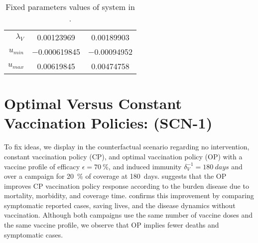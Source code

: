 \begin{table*}[tbh]
\begin{center}
\begin{tabular}{rc@{}c}
            $\lambda_{V}$
            & \num{0.00123969}
            & \num{0.00189903}
            \\
            $u_{min}$
            & \num{-0.000619845}
            & \num{-0.00094952}
            \\
            $u_{max}$
            & \num{0.00619845}
            & \num{0.00474758}
            \\
            \bottomrule
        \end{tabular}
        \caption{%
            Fixed parameters values of system in
            .}
        \label{tbl:fixed_parameters-OCM}
    \end{center}
\end{table*}
%
\section*{Optimal Versus Constant Vaccination Policies: (SCN-1)}
To fix ideas, we display in
the counterfactual scenario regarding no intervention, constant vaccination
policy (CP), and optimal vaccination policy (OP) with a vaccine profile of
efficacy $\epsilon = \SI{70}{\percent}$, and induced immunity
$\delta_V^{-1} = \SI{180}{days}$ and over a campaign for \SI{20}{\percent}
of coverage at \SI{180}{days}. 
suggests that the OP improves CP vaccination policy response according to
the burden disease due to mortality, morbidity, and coverage time.
 confirms this improvement by
comparing symptomatic reported cases, saving lives, and the disease dynamics
without vaccination. Although both campaigns use the same number of vaccine
doses and the same vaccine profile, we observe that OP implies fewer deaths
and symptomatic cases.

